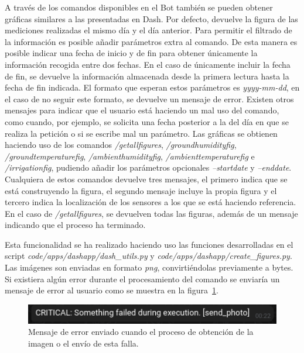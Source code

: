 \documentclass[a4paper, 12pt, oneside]{book}
\begin{document}
A través de los comandos disponibles en el Bot también se pueden obtener gráficas similares a las presentadas en Dash. Por defecto, devuelve la figura de las mediciones realizadas el mismo día y el día anterior. Para permitir el filtrado de la información es posible añadir parámetros extra al comando. De esta manera es posible indicar una fecha de inicio y de fin para obtener únicamente la información recogida entre dos fechas. En el caso de únicamente incluir la fecha de fin, se devuelve la información almacenada desde la primera lectura hasta la fecha de fin indicada. El formato que esperan estos parámetros es \textit{yyyy-mm-dd}, en el caso de no seguir este formato, se devuelve un mensaje de error.
Existen otros mensajes para indicar que el usuario está haciendo un mal uso del comando, como cuando, por ejemplo, se solicita una fecha posterior a la del día en que se realiza la petición o si se escribe mal un parámetro.
Las gráficas se obtienen haciendo uso de los comandos \textit{/getallfigures}, \textit{/groundhumidityfig}, \textit{/groundtemperaturefig}, \textit{/ambienthumidityfig}, \textit{/ambienttemperaturefig} e \textit{/irrigationfig}, pudiendo añadir los parámetros opcionales \textit{--startdate} y \textit{--enddate}. Cualquiera de estos comandos devuelve tres mensajes, el primero indica que se está construyendo la figura, el segundo mensaje incluye la propia figura y el tercero indica la localización de los sensores a los que se está haciendo referencia. En el caso de \textit{/getallfigures}, se devuelven todas las figuras, además de un mensaje indicando que el proceso ha terminado.

Esta funcionalidad se ha realizado haciendo uso las funciones desarrolladas en el script \textit{code/apps/dashapp/dash\_utils.py} y \textit{code/apps/dashapp/create\_figures.py}. Las imágenes son enviadas en formato \textit{png}, convirtiéndolas previamente a bytes. Si existiera algún error durante el procesamiento del comando se enviaría un mensaje de error al usuario como se muestra en la figura~\ref{figura:error send photo}.
\begin{figure}[H]
	\centering
    \includegraphics[width=12cm, keepaspectratio]{img/error_send_photo}
    \caption{Mensaje de error enviado cuando el proceso de obtención de la imagen o el envío de esta falla.}
    \label{figura:error send photo}
\end{figure}
\end{document}
